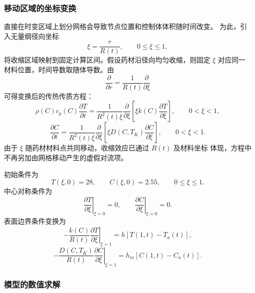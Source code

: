 \documentclass[12pt,a4paper]{article}
\begin{document}
\begin{center}
\subsubsection{移动区域的坐标变换}

直接在时变区域上划分网格会导致节点位置和控制体体积随时间改变。
为此，引入无量纲径向坐标
\begin{equation}
\xi=\frac{r}{R(t)},\qquad 0\leq\xi\leq1,
\label{eq:q4-coordinate}
\end{equation}
将收缩区域映射到固定计算区间。假设药材沿径向均匀收缩，则固定
$\xi$ 对应同一材料位置，时间导数取随体导数。由
\begin{equation}
\frac{\partial}{\partial r}
=\frac{1}{R(t)}\frac{\partial}{\partial\xi}
\end{equation}
可得变换后的传热传质方程：
\begin{equation}
\rho(C)c_p(C)\frac{\partial T}{\partial t}
=\frac{1}{R^2(t)\xi}
\frac{\partial}{\partial\xi}
\left[\xi k(C)\frac{\partial T}{\partial\xi}\right],
\qquad 0<\xi<1,
\label{eq:q4-heat}
\end{equation}
\begin{equation}
\frac{\partial C}{\partial t}
=\frac{1}{R^2(t)\xi}
\frac{\partial}{\partial\xi}
\left[\xi D(C,T_K)\frac{\partial C}{\partial\xi}\right],
\qquad 0<\xi<1.
\label{eq:q4-moisture}
\end{equation}
由于 $\xi$ 随药材材料点共同移动，收缩效应已通过 $R(t)$ 及材料坐标
体现，方程中不再另加由网格移动产生的虚假对流项。

初始条件为
\begin{equation}
T(\xi,0)=28,\qquad C(\xi,0)=2.55,
\qquad 0\leq\xi\leq1.
\label{eq:q4-initial}
\end{equation}
中心对称条件为
\begin{equation}
\left.\frac{\partial T}{\partial\xi}\right|_{\xi=0}=0,
\qquad
\left.\frac{\partial C}{\partial\xi}\right|_{\xi=0}=0.
\label{eq:q4-center}
\end{equation}
表面边界条件变换为
\begin{equation}
-\frac{k(C)}{R(t)}
\left.\frac{\partial T}{\partial\xi}\right|_{\xi=1}
=h[T(1,t)-T_a(t)],
\label{eq:q4-heat-bc}
\end{equation}
\begin{equation}
-\frac{D(C,T_K)}{R(t)}
\left.\frac{\partial C}{\partial\xi}\right|_{\xi=1}
=h_m[C(1,t)-C_a(t)].
\label{eq:q4-moisture-bc}
\end{equation}

\subsubsection{模型的数值求解}


\end{center}
\end{document}
